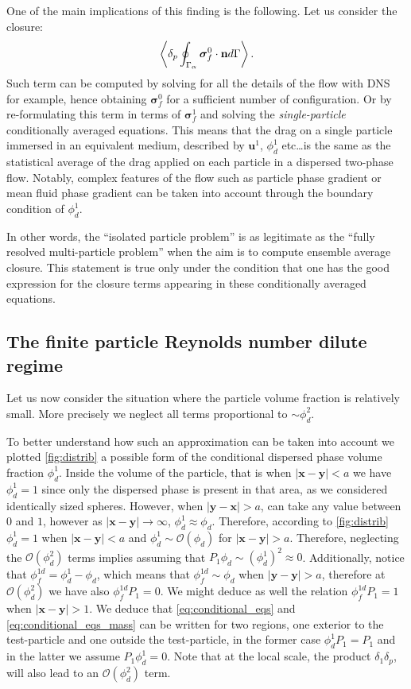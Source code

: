One of the main implications of this finding is the following.
Let us consider the closure: 
\begin{equation}
    \left<\delta_p \oint_{\Gamma_{\alpha}} \bm\sigma_f^0 \cdot \textbf{n} d\Gamma\right>. 
\end{equation}
Such term can be computed by solving for all the details of the flow with DNS for example, hence obtaining $\bm\sigma_f^0$ for a sufficient number of configuration. 
Or by re-formulating this term in terms of $\bm\sigma_f^1$ and solving the \textit{single-particle} conditionally averaged equations.
This means that the drag on a single particle immersed in an equivalent medium, described by $\textbf{u}^1$, $\phi_d^1$ etc\ldots is the same as the statistical average of the drag applied on each particle in a dispersed two-phase flow. 
Notably, complex features of the flow such as particle phase gradient or mean fluid phase gradient can be taken into account through the boundary condition of $\phi_d^1$. 

In other words, the ``isolated particle problem'' is as legitimate as the ``fully resolved multi-particle problem'' when the aim is to compute ensemble average closure.
This statement is true only under the condition that one has the good expression for the closure terms appearing in these conditionally averaged equations. 

\subsection{The finite particle Reynolds number dilute regime}
Let us now consider the situation where the particle volume fraction is relatively small. 
More precisely we neglect all terms proportional to $\sim \phi_d^2$. 

To better understand how such an approximation can be taken into account we plotted \ref{fig:distrib} a possible form of the conditional dispersed phase volume fraction $\phi_d^1$.
Inside the volume of the particle, that is when $|\textbf{x}-\textbf{y}| < a$ we have $\phi_d^1 = 1$ since only the dispersed phase is present in that area, as we considered identically sized spheres. 
However, when $|\textbf{y} - \textbf{x}| >a$, can take any value between $0$ and $1$, however as $|\textbf{x}- \textbf{y}|\to\infty$, $\phi_d^1 \approx \phi_d$.
Therefore, according to \ref{fig:distrib} $\phi_d^1 = 1$ when $|\textbf{x}-\textbf{y}| < a$  and $\phi_d^1 \sim \mathcal{O}(\phi_d)$ for $|\textbf{x}-\textbf{y}| > a$. 
Therefore, neglecting the $\mathcal{O}(\phi_d^2)$ terms  implies assuming that $P_1 \phi_d \sim (\phi_d^1)^2 \approx 0$. 
Additionally, notice that $\phi_f^{1d} = \phi_d^1 - \phi_d$, which means that $\phi_f^{1d} \sim \phi_d$ when $|\textbf{y} -\textbf{y}| > a$, therefore at  $\mathcal{O}(\phi_d^2)$ we have also $\phi_f^{1d} P_1= 0$.
We might deduce as well the relation $\phi_f^{1d} P_1 = 1$ when $|\textbf{x}-\textbf{y}| >1$. 
We deduce that \ref{eq:conditional_eqs} and \ref{eq:conditional_eqs_mass} can be written for two regions, one exterior to the test-particle and one outside the test-particle, in the former case $\phi_d^1P_1  = P_1$ and in the latter we assume $P_1 \phi_d^1 = 0$. 
Note that at the local scale, the product $\delta_1\delta_p$, will also lead to an $\mathcal{O}(\phi_d^2)$ term.  

